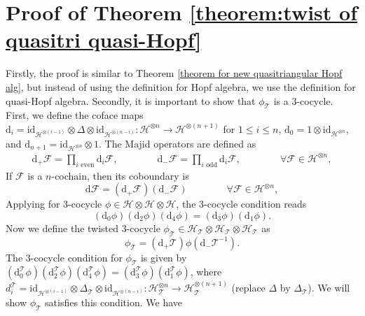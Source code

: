 \documentclass[reqno]{amsart}
\theoremstyle{definition}
\theoremstyle{remark}
\begin{document}
\appendix
\section{Proof of Theorem \ref{theorem:twist of quasitri quasi-Hopf}}\label{appendix 1}
Firstly, the proof is similar to Theorem \ref{theorem for new quasitriangular Hopf alg}, but instead of using the definition for Hopf algebra, we use the definition for quasi-Hopf algebra. Secondly, it is important to show that $\phi_\mathcal{T}$ is a 3-cocycle. First, we define the coface maps $\text{d}_i=\textrm{id}_{\mathscr{H}^{\otimes (i-1)}}\otimes \Delta \otimes\textrm{id}_{\mathscr{H}^{\otimes (n-i)}}:\mathscr{H}^{\otimes n} \longrightarrow \mathscr{H}^{\otimes (n+1)}$ for $1\leq i \leq n$, $\text{d}_0=1\otimes\textrm{id}_{\mathscr{H}^{\otimes n}}$, and $\text{d}_{n+1}=\textrm{id}_{\mathscr{H}^{\otimes n}} \otimes 1$. The Majid operators are defined as
    \begin{equation}
        \begin{split}
            \text{d}_+ \mathcal{F}=\mathop \prod \limits_{i{\textrm{ even}}} {\text{d}_i}\mathcal{F}, \qquad \qquad \text{d}_- \mathcal{F}=\mathop \prod \limits_{i{\textrm{ odd}}} {\text{d}_i}\mathcal{F}, \qquad \qquad \forall\mathcal{F} \in \mathscr{H}^{\otimes n},
        \end{split}
    \end{equation}
    If $\mathcal{F}$ is a $n$-cochain, then its coboundary is
    \begin{equation}
        \text{d}\mathcal{F}=(\text{d}_+\mathcal{F})(\text{d}_-\mathcal{F})\qquad \qquad \forall\mathcal{F} \in \mathscr{H}^{\otimes n},
    \end{equation}
    Applying for 3-cocycle $\phi \in \mathscr{H}\otimes \mathscr{H} \otimes \mathscr{H}$, the 3-cocycle condition reads
    \begin{equation}
        (\text{d}_0\phi) (\text{d}_2  \phi)(\text{d}_4  \phi) = (\text{d}_3  \phi)(\text{d}_1  \phi).
    \end{equation}
    Now we define the twisted 3-cocycle $\phi_\mathcal{T} \in \mathscr{H}_\mathcal{T}\otimes \mathscr{H}_\mathcal{T}\otimes \mathscr{H}_\mathcal{T}$ as
    \begin{equation}
        \phi_\mathcal{T}= (\text{d}_+ \mathcal{T})\phi (\text{d}_-\mathcal{T}^{-1}).
    \end{equation}
    The 3-cocycle condition for $\phi_\mathcal{T}$ is given by $(\text{d}_0^{\mathcal{T}}\phi) (\text{d}_2^{\mathcal{T}}  \phi)(\text{d}_4^{\mathcal{T}}  \phi) = (\text{d}_3^{\mathcal{T}}  \phi)(\text{d}_1^{\mathcal{T}}  \phi)$, where $d^\mathcal{T}_i =\textrm{id}_{\mathscr{H}^{\otimes (i-1)}}\otimes \Delta_\mathcal{T} \otimes\textrm{id}_{\mathscr{H}^{\otimes (n-i)}}:\mathscr{H}_\mathcal{T}^{\otimes n} \longrightarrow \mathscr{H}_\mathcal{T}^{\otimes (n+1)} $ (replace $\Delta$ by $\Delta_\mathcal{T}$). We will show $\phi_\mathcal{T}$ satisfies this condition. We have
\end{document}
